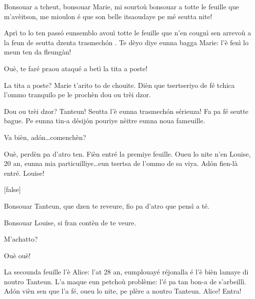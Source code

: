 \begin{drama}

\Tanteunspeaks Bonsouar a tcheut, bonsouar Marie, mi sourtoù bonsouar a totte le feuille que m'avèitson, me mioulon é que son belle itsaoudaye pe mé seutta nite! 


\Tanteunspeaks{} Aprì to lo ten pass\'o eunsemblo avouì totte le feuille que n’en cougnì sen arrevoù a la feun de seutta dzenta trasmech\'on . Te dèyo diye eunna bagga Marie: l'è fenì lo meun ten da fleungàn!

\Mariespeaks  Ouè, te faré praou ataqué a betì la tita a poste!

\Tanteunspeaks La tita a poste? Marie t’arito to de chouite. Dièn que tsertseriyo de fé tchica l'ommo tranquilo pe le prochèn dou ou trèi dzor.

\Mariespeaks Dou ou trèi dzor? Tanteun! Seutta l'è eunna trasmech\'on sérieuza! Fa pa fé seutte bague. Pe eunna tin-a désij\'on pouriye nèitre eunna noua fameuille.

\Tanteunspeaks{} Va bièn, ad\'on\ldots comenchèn?

\Mariespeaks Ouè, perdèn pa d'atro ten. Fièn entré la premiye feuille. Oueu lo nite n'en Louise, 20 an, eunna mia particuilliye\ldots eun tsertsa de l'ommo de sa viya. Ad\'on fien-là entré. Louise!

[false]%


\Louisespeaks Bonsouar Tanteun, que dzen te reveure, fio pa d'atro que pensì a té.

\Tanteunspeaks{} Bonsouar Louise,  si fran contèn de te veure.

\Louisespeaks M'achatto?

\Tanteunspeaks Ouè ouè!


\Mariespeaks La secounda feuille l'è Alice: l'at 28 an, eumplouayé réjonalla é l'è bièn lamaye di noutro Tanteun. L'a maque eun petchoù problème: l'é pa tan bon-a de s'arbeillì. Ad\'on vièn sen que l'a fé, oueu lo nite, pe plère a noutro Tanteun. Alice! Entra!


\end{drama}
